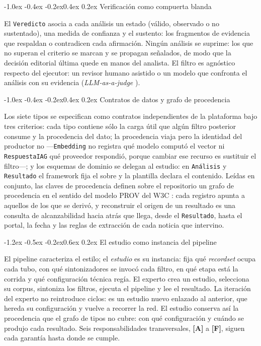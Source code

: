 \documentclass[12pt,a4paper,twocolumn]{article}
\makeatletter
\renewcommand\section{\@startsection{section}{1}{\z@}%
  {-1.2ex \@plus -0.5ex \@minus -0.2ex}{0.6ex \@plus 0.2ex}%
  {\normalfont\normalsize\bfseries}}
\renewcommand\subsection{\@startsection{subsection}{2}{\z@}%
  {-1.0ex \@plus -0.4ex \@minus -0.2ex}{0.4ex \@plus 0.2ex}%
  {\normalfont\normalsize\bfseries\itshape}}
\newcommand{\respn}[1]{\textbf{[#1]}}  %
\makeatother
\begin{document}
\subsection{Verificación como compuerta blanda}

El \texttt{Veredicto} asocia a cada análisis un estado (válido, observado o no sustentado), una medida de confianza y el sustento: los fragmentos de evidencia que respaldan o contradicen cada afirmación. Ningún análisis se suprime: los que no superan el criterio se marcan y se propagan señalados, de modo que la decisión editorial última quede en manos del analista. El filtro es agnóstico respecto del ejecutor: un revisor humano asistido o un modelo que confronta el análisis con su evidencia (\textit{LLM-as-a-judge} \cite{zheng:2023}).

\subsection{Contratos de datos y grafo de procedencia}

Los siete tipos se especifican como contratos independientes de la plataforma bajo tres criterios: cada tipo contiene sólo la carga útil que algún filtro posterior consume y la procedencia del dato; la procedencia viaja pero la identidad del productor no ---\texttt{Embedding} no registra qué modelo computó el vector ni \texttt{RespuestaIAG} qué proveedor respondió, porque cambiar ese recurso es sustituir el filtro---; y los esquemas de dominio se delegan al estudio: en \texttt{Análisis} y \texttt{Resultado} el framework fija el sobre y la plantilla declara el contenido. Leídas en conjunto, las claves de procedencia definen sobre el repositorio un grafo de procedencia en el sentido del modelo PROV del W3C \cite{provdm:2013}: cada registro apunta a aquellos de los que se derivó, y reconstruir el origen de un resultado es una consulta de alcanzabilidad hacia atrás \cite{cuevasvicenttin:2012} que llega, desde el \texttt{Resultado}, hasta el portal, la fecha y las reglas de extracción de cada noticia que intervino.

\section{El estudio como instancia del pipeline}

El pipeline caracteriza el estilo; el \textit{estudio} es su instancia: fija qué \textit{recordset} ocupa cada tubo, con qué sintonizadores se invocó cada filtro, en qué etapa está la corrida y qué configuración técnica regía. El experto crea un estudio, selecciona su corpus, sintoniza los filtros, ejecuta el pipeline y lee el resultado. La iteración del experto no reintroduce ciclos: es un estudio nuevo enlazado al anterior, que hereda su configuración y vuelve a recorrer la red. El estudio conserva así la procedencia que el grafo de tipos no cubre: con qué configuración y cuándo se produjo cada resultado. Seis responsabilidades transversales, \respn{A} a \respn{F}, siguen cada garantía hasta donde se cumple.
\end{document}
